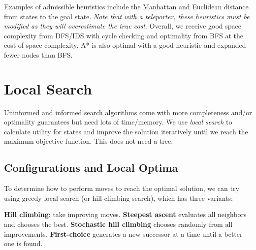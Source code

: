 \documentclass{report}
\begin{document}

Examples of admissible heuristics include the Manhattan and Euclidean distance from states to the goal state. \emph{Note that with a teleporter, these heuristics must be modified as they will overestimate the true cost}. Overall, we receive good space complexity from DFS/IDS with cycle checking and optimality from BFS at the cost of space complexity. A* is also optimal with a good heuristic and expanded fewer nodes than BFS. 

\chapter{Local Search}

Uninformed and informed search algorithms come with more completeness and/or optimality guarantees but need lots of time/memory. We use \emph{local search} to calculate utility for states and improve the solution iteratively until we reach the maximum objective function. This does not need a tree.

\section{Configurations and Local Optima}


To determine how to perform moves to reach the optimal solution, we can try using greedy local search (or hill-climbing search), which has three variants:

\textbf{Hill climbing}: take improving moves. \textbf{Steepest ascent} evaluates all neighbors and chooses the best. \textbf{Stochastic hill climbing} chooses randomly from all improvements. \textbf{First-choice} generates a new successor at a time until a better one is found.
\end{document}
